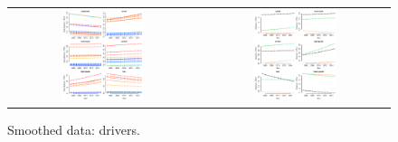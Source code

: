 \documentclass{article}
\begin{document}

\begin{figure}[H]
\centering
\begin{tabular}{cc}
\includegraphics[width=0.45\textwidth]{driverSmooth.pdf}&\includegraphics[width=0.45\textwidth]{roadsSmooth.pdf}
\end{tabular}
\caption{\small Smoothed data: drivers.}
\label{smoothdrive}
\end{figure}
\end{document}
